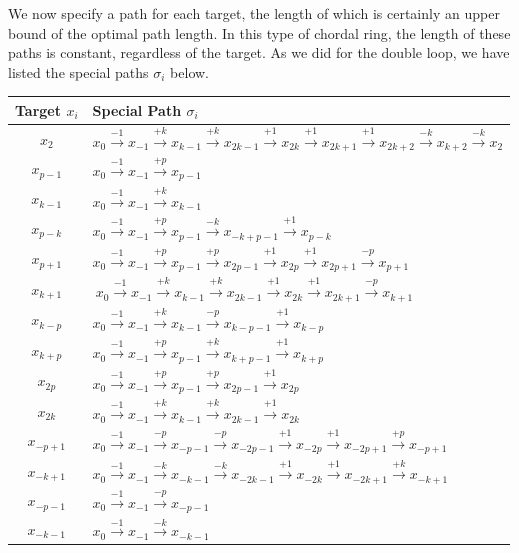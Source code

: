 We now specify a path for each target, the length of which is certainly an upper bound of the optimal path length. In this type of chordal ring, the length of these paths is constant, regardless of the target. As we did for the double loop, we have listed the special paths $\sigma_i$ below.




 
\begin{center}
  \begin{tabular}{|c|l|}
 \hline
 Target $x_i$ & Special Path $\sigma_i$\\
 \hline
  $x_{2}$ &  $ x_{0} \xrightarrow {-1} x_{-1} \xrightarrow {+k} x_{k-1} \xrightarrow {+k} x_{2k-1} \xrightarrow {+1} x_{2k}  \xrightarrow {+1} x_{2k+1} \xrightarrow {+1} x_{2k+2} \xrightarrow {-k} x_{k+2} \xrightarrow {-k} x_{2}$\\
  $x_{p-1}$ &  $ x_{0} \xrightarrow {-1} x_{-1} \xrightarrow {+p} x_{p-1} $\\
  $x_{k-1}$ &  $ x_{0} \xrightarrow {-1} x_{-1} \xrightarrow {+k} x_{k-1} $\\
  $x_{p-k}$ &  $ x_{0} \xrightarrow {-1} x_{-1} \xrightarrow {+p} x_{p-1} \xrightarrow {-k} x_{-k+p-1} \xrightarrow {+1} x_{p-k}$\\
  $x_{p+1}$ &  $ x_{0} \xrightarrow {-1} x_{-1} \xrightarrow {+p} x_{p-1}\xrightarrow {+p} x_{2p-1}\xrightarrow {+1} x_{2p} \xrightarrow {+1} x_{2p+1}\xrightarrow {-p} x_{p+1}$\\
  $x_{k+1}$ &  $\ x_{0} \xrightarrow {-1} x_{-1} \xrightarrow {+k} x_{k-1}\xrightarrow {+k} x_{2k-1}\xrightarrow {+1} x_{2k} \xrightarrow {+1} x_{2k+1}\xrightarrow {-p} x_{k+1}$\\
  $x_{k-p}$ &  $ x_{0} \xrightarrow {-1} x_{-1} \xrightarrow {+k} x_{k-1} \xrightarrow {-p} x_{k-p-1}\xrightarrow {+1} x_ {k-p}$\\

$x_{k+p}$ &   $ x_{0}\xrightarrow {-1} x_{-1} \xrightarrow {+p} x_{p-1} \xrightarrow {+k} x_{k+p-1} \xrightarrow {+1} x_{k+p}$\\
  $x_{2p}$ &  $ x_{0} \xrightarrow {-1} x_{-1} \xrightarrow {+p} x_{p-1} \xrightarrow {+p} x_{2p-1}\xrightarrow {+1} x_{2p}$\\
  $x_{2k}$ &  $ x_{0} \xrightarrow {-1} x_{-1} \xrightarrow {+k} x_{k-1} \xrightarrow {+k} x_{2k-1}\xrightarrow {+1} x_{2k}$\\
 $x_{-p+1}$ & $ x_{0} \xrightarrow {-1} x_{-1} \xrightarrow {-p} x_{-p-1} \xrightarrow {-p} x_{-2p-1} \xrightarrow {+1} x_ {-2p} \xrightarrow {+1} x_ {-2p+1}\xrightarrow {+p} x_ {-p+1}$\\
 $x_{-k+1}$ & $ x_{0} \xrightarrow {-1} x_{-1} \xrightarrow {-k} x_{-k-1} \xrightarrow {-k} x_{-2k-1} \xrightarrow {+1} x_ {-2k} \xrightarrow {+1} x_ {-2k+1}\xrightarrow {+k} x_ {-k+1}$\\
 $x_{-p-1}$ & $ x_{0} \xrightarrow {-1} x_{-1} \xrightarrow {-p} x_{-p-1} $\\
 $x_{-k-1}$ & $ x_{0} \xrightarrow {-1} x_{-1} \xrightarrow {-k} x_{-k-1} $\\


\end{tabular}
\end{center}
